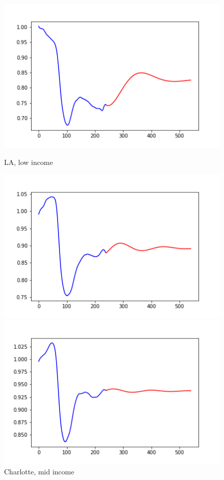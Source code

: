 \documentclass{article}
\begin{document}
\begin{figure}[ht]
\begin{minipage}[b]{0.3\linewidth}
\centering
\includegraphics[width=\textwidth]{LA_lowinc_emp.png}
\caption{LA, low income}
\end{minipage}
\hspace{0.5cm}
\begin{minipage}[b]{0.3\linewidth}
\centering
\includegraphics[width=\textwidth]{LA_midinc_emp.png}
\caption{Charlotte, mid income}
\end{minipage}
\hspace{0.5cm}
\begin{minipage}[b]{0.3\linewidth}
\centering
\includegraphics[width=\textwidth]{LA_highinc_emp.png}

\end{minipage}
\end{figure}
\end{document}
